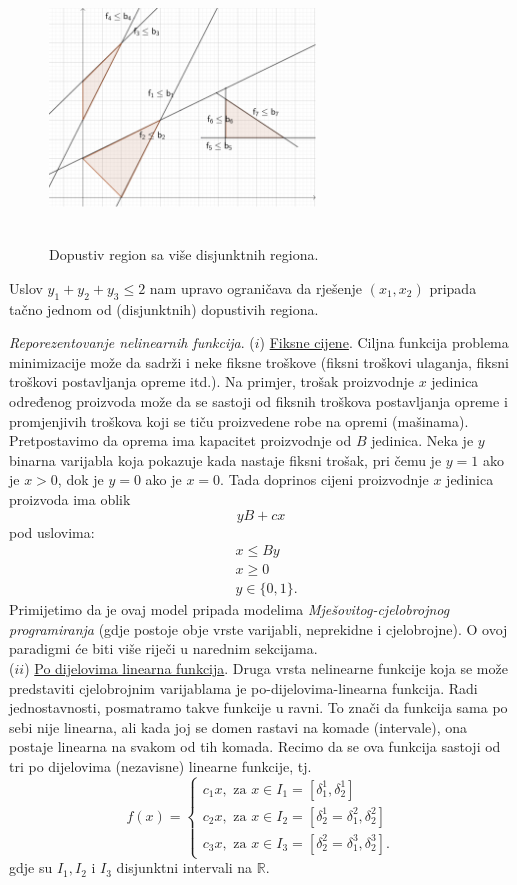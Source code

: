 \documentclass[a4paper, utf8, 11pt, colorlinks]{article}
\begin{document}
\begin{figure}[!ht]
    \centering
    \includegraphics[width=200pt, height=200pt]{compound.eps}
    \caption{Dopustiv region sa više disjunktnih regiona.}
    \label{fig:compound_regions}
\end{figure}
Uslov $y_1 + y_2 + y_3 \leq 2$ nam upravo ograničava da rješenje $(x_1, x_2)$ pripada tačno jednom od (disjunktnih) dopustivih regiona. 

\emph{Reporezentovanje nelinearnih funkcija}. ($i$) \underline{Fiksne cijene}. Ciljna funkcija problema minimizacije može da sadrži i neke fiksne troškove (fiksni troškovi ulaganja, fiksni troškovi postavljanja opreme itd.). Na primjer, trošak proizvodnje $x$ jedinica određenog proizvoda može da se sastoji od fiksnih troškova postavljanja opreme i promjenjivih troškova koji se tiču proizvedene robe na opremi (mašinama). Pretpostavimo da oprema ima kapacitet proizvodnje od $B$ jedinica. Neka je $y$ binarna varijabla koja pokazuje kada nastaje fiksni trošak, pri čemu  je $y=1$ ako je $x >0$, dok je $y=0$ ako je $x=0$. Tada doprinos cijeni proizvodnje $x$ jedinica proizvoda ima oblik 
$$ yB + c x $$ pod uslovima:
\begin{align}
     &x \leq By \\
     & x \geq 0 \\
     & y \in \{0, 1\}.
\end{align}
Primijetimo da je ovaj model pripada modelima \emph{Mješovitog-cjelobrojnog programiranja} (gdje postoje obje vrste varijabli, neprekidne i cjelobrojne). O ovoj paradigmi će biti više riječi u narednim sekcijama. \\
($ii$) \underline{{Po dijelovima linearna funkcija}}. Druga vrsta nelinearne funkcije koja se može predstaviti cjelobrojnim varijablama je po-dijelovima-linearna funkcija. Radi jednostavnosti, posmatramo takve funkcije u ravni. To znači da funkcija sama po sebi nije linearna, ali kada joj se domen rastavi na komade (intervale), ona postaje linearna na svakom od tih komada. Recimo da se ova funkcija sastoji od tri po dijelovima (nezavisne) linearne funkcije, tj. 
$$f(x) = \begin{cases}
          c_1 x, \mbox{ za } x \in I_1 = [\delta^1_1, \delta^1_2] \\
          c_2 x, \mbox{ za } x \in I_2 = [\delta^1_2 = \delta^2_1, \delta^2_2] \\
          c_3 x, \mbox{ za } x \in I_3 = [\delta^2_2 = \delta^3_1, \delta^3_2].
      \end{cases}
$$
gdje su $I_1, I_2$ i $I_3$ disjunktni intervali na $\mathbb{R}$.
\end{document}
